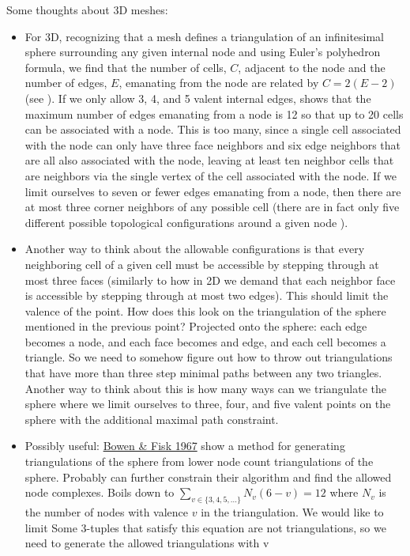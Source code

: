 \documentclass{article}
\begin{document}
Some thoughts about 3D meshes:
\begin{itemize}
    \item For 3D, recognizing that a mesh defines a triangulation of an infinitesimal sphere surrounding any given internal node and using Euler's polyhedron formula, we find that the number of cells, $C$, adjacent to the node and the number of edges, $E$, emanating from the node are related by $C = 2(E-2)$ (see \cite{Liu:2018}). If we only allow 3, 4, and 5 valent internal edges, \cite{Liu:2018} shows that the maximum number of edges emanating from a node is 12 so that up to 20 cells can be associated with a node. This is too many, since a single cell associated with the node can only have three face neighbors and six edge neighbors that are all also associated with the node, leaving at least ten neighbor cells that are neighbors via the single vertex of the cell associated with the node. If we limit ourselves to seven or fewer edges emanating from a node, then there are at most three corner neighbors of any possible cell (there are in fact only five different possible topological configurations around a given node \cite{Liu:2018}). 

    \item Another way to think about the allowable configurations is that every neighboring cell of a given cell must be accessible by stepping through at most three faces (similarly to how in 2D we demand that each neighbor face is accessible by stepping through at most two edges). This should limit the valence of the point. How does this look on the triangulation of the sphere mentioned in the previous point? Projected onto the sphere: each edge becomes a node, and each face becomes and edge, and each cell becomes a triangle. So we need to somehow figure out how to throw out triangulations that have more than three step minimal paths between any two triangles. Another way to think about this is how many ways can we triangulate the sphere where we limit ourselves to three, four, and five valent points on the sphere with the additional maximal path constraint. 
    \item Possibly useful: \href{https://www.ams.org/journals/mcom/1967-21-098/S0025-5718-1967-0223277-3/S0025-5718-1967-0223277-3.pdf}{Bowen \& Fisk 1967} show a method for generating triangulations of the sphere from lower node count triangulations of the sphere. Probably can further constrain their algorithm and find the allowed node complexes. Boils down to $\sum_{v \in \{3, 4, 5, ...\}} N_v (6 - v) = 12$ where $N_v$ is the number of nodes with valence $v$ in the triangulation. We would like to limit Some 3-tuples that satisfy this equation are not triangulations, so we need to generate the allowed triangulations with v
\end{itemize}
\end{document}
